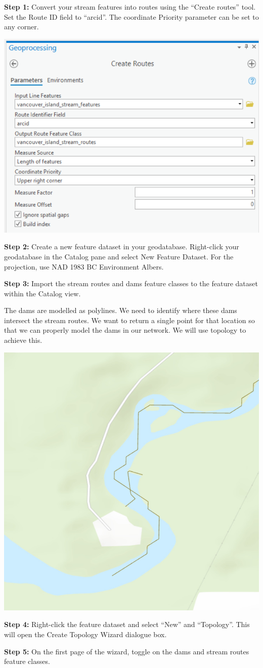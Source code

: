 \documentclass[
]{book}
\begin{document}
\textbf{Step 1:} Convert your stream features into routes using the ``Create routes'' tool. Set the Route ID field to ``arcid''. The coordinate Priority parameter can be set to any corner.

\includegraphics[width=0.5\linewidth]{images/02-create-routes}

\textbf{Step 2:} Create a new feature dataset in your geodatabase. Right-click your geodatabase in the Catalog pane and select New Feature Dataset. For the projection, use NAD 1983 BC Environment Albers.

\textbf{Step 3:} Import the stream routes and dams feature classes to the feature dataset within the Catalog view.

The dams are modelled as polylines. We need to identify where these dams intersect the stream routes. We want to return a single point for that location so that we can properly model the dams in our network. We will use topology to achieve this.

\includegraphics[width=0.5\linewidth]{images/02-example-dam}

\textbf{Step 4:} Right-click the feature dataset and select ``New'' and ``Topology''. This will open the Create Topology Wizard dialogue box.

\textbf{Step 5:} On the first page of the wizard, toggle on the dams and stream routes feature classes.
\end{document}
